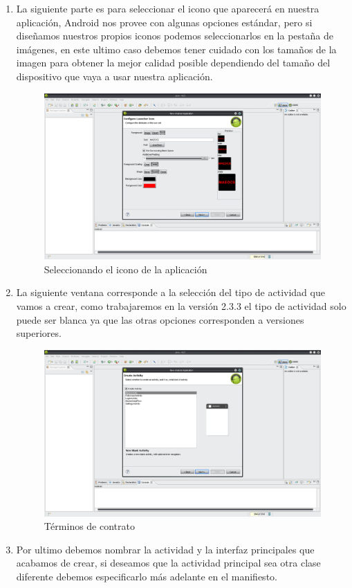 \documentclass[11pt]{book}
\begin{document}
\begin{enumerate}[1.]
\newpage
\item La siguiente parte es para seleccionar el icono que aparecerá en nuestra aplicación, Android nos provee con algunas opciones estándar, pero si diseñamos nuestros propios iconos podemos seleccionarlos en la pestaña de imágenes, en este ultimo caso debemos tener cuidado con los tamaños de la imagen para obtener la mejor calidad posible dependiendo del tamaño del dispositivo que vaya a usar nuestra aplicación.

\begin{figure}[H]
  \centering
    \includegraphics[width=1.0\textwidth]{tutorial_21}
  \caption{Seleccionando el icono de la aplicación}
  \label{fig:tutorial_21}
\end{figure}
\newpage
\item La siguiente ventana corresponde a la selección del tipo de actividad que vamos a crear, como trabajaremos en la versión 2.3.3 el tipo de actividad solo puede ser blanca ya que las otras opciones corresponden a versiones superiores.

\begin{figure}[H]
  \centering
    \includegraphics[width=1.0\textwidth]{tutorial_22}
  \caption{Términos de contrato}
  \label{fig:tutorial_22}
\end{figure}
\newpage
\item Por ultimo debemos nombrar la actividad y la interfaz principales que acabamos de crear, si deseamos que la actividad principal sea otra clase diferente debemos especificarlo más adelante en el manifiesto.


\end{enumerate}
\end{document}
